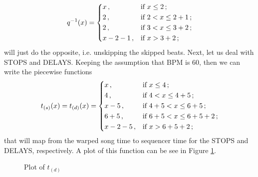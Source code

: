 \documentclass[a4paper,9pt]{article}
\begin{document}
    \begin{equation}
	    q^{-1}(x) = \begin{dcases}
		    x\,, & \text{if $ x \leq 2 $}\,;\\
		    2\,, & \text{if $2 <  x \leq 2+1 $}\,;\\
		    2\,, & \text{if $3 <  x \leq 3+2 $}\,;\\
		    x - 2 - 1\,, & \text{if $x > 3+2 $}\,;\\
	    \end{dcases}
    \end{equation}
    will just do the opposite, i.e. unskipping the skipped beats. Next, let us deal with STOPS and DELAYS. Keeping the assumption that BPM is 60, then we can write the piecewise functions
    \begin{equation}
	    t_{(s)}(x) = t_{(d)}(x) = \begin{dcases}
		    x\,, & \text{if $ x \leq 4 $}\,; \\
		    4\,, & \text{if $4 <  x \leq 4+5 $}\,; \\
		    x-5\,, & \text{if $4 + 5 <  x \leq 6 + 5 $}\,; \\
		    6+5\,, & \text{if $6 + 5 <  x \leq 6 + 5+ 2 $}\,; \\
		    x-2-5\,, & \text{if $ x > 6+5+2 $}\,; \\
	    \end{dcases}
	    \label{l}
    \end{equation}
    that will map from the warped song time to sequencer time for the STOPS and DELAYS, respectively. A plot of this function can be see in Figure \ref{fig:songtime2seqtime}. 
    
\begin{figure}[htpb]
	\centering

\caption{Plot of $t_{(d)}$ }
	\label{fig:songtime2seqtime}
\end{figure}
\end{document}
